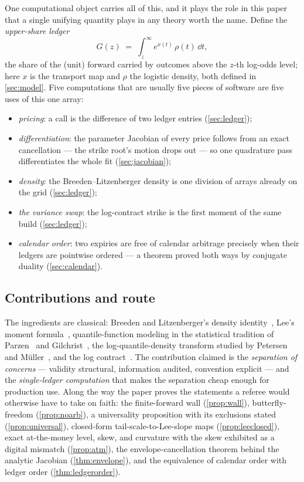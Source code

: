 One computational object carries all of this, and it plays the role in this
paper that a single unifying quantity plays in any theory worth the name.
Define the \emph{upper-share ledger}
\[
G(z)\;=\;\int_z^{\infty}e^{x(t)}\,\rho(t)\,\dd t ,
\]
the share of the (unit) forward carried by outcomes above the $z$-th
log-odds level; here $x$ is the transport map and $\rho$ the logistic
density, both defined in \cref{sec:model}.  Five computations that are
usually five pieces of software are five uses of this one array:
\begin{itemize}[leftmargin=1.4em]
\item \emph{pricing}: a call is the difference of two ledger entries
(\cref{sec:ledger});
\item \emph{differentiation}: the parameter Jacobian of every price follows
from an exact cancellation --- the strike root's motion drops out --- so one
quadrature pass differentiates the whole fit (\cref{sec:jacobian});
\item \emph{density}: the Breeden--Litzenberger density is one division of
arrays already on the grid (\cref{sec:ledger});
\item \emph{the variance swap}: the log-contract strike is the first moment
of the same build (\cref{sec:ledger});
\item \emph{calendar order}: two expiries are free of calendar arbitrage
precisely when their ledgers are pointwise ordered --- a theorem proved both
ways by conjugate duality (\cref{sec:calendar}).
\end{itemize}

\subsection{Contributions and route}

The ingredients are classical: Breeden and Litzenberger's density
identity~\citep{BreedenLitzenberger1978}, Lee's moment
formula~\citep{Lee2004}, quantile-function modeling in the statistical
tradition of Parzen~\citep{Parzen1979} and Gilchrist~\citep{Gilchrist2000},
the log-quantile-density transform studied by Petersen and
M\"uller~\citep{PetersenMuller2016}, and the log
contract~\citep{Neuberger1994}.  The contribution claimed is the
\emph{separation of concerns} --- validity structural, information audited,
convention explicit --- and the \emph{single-ledger computation} that makes
the separation cheap enough for production use.  Along the way the paper
proves the statements a referee would otherwise have to take on faith: the
finite-forward wall (\cref{prop:wall}), butterfly-freedom
(\cref{prop:noarb}), a universality proposition with its exclusions stated
(\cref{prop:universal}), closed-form tail-scale-to-Lee-slope maps
(\cref{prop:leeclosed}), exact at-the-money level, skew, and curvature with
the skew exhibited as a digital mismatch (\cref{prop:atm}), the
envelope-cancellation theorem behind the analytic Jacobian
(\cref{thm:envelope}), and the equivalence of calendar order with ledger
order (\cref{thm:ledgerorder}).

